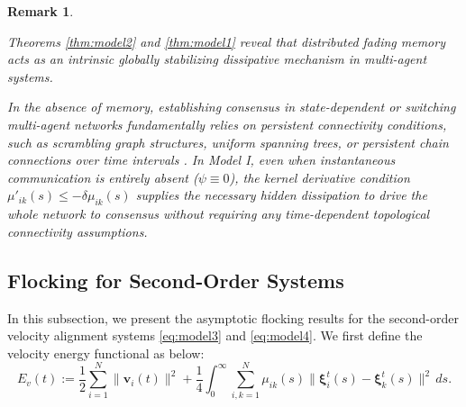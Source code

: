 \documentclass[11pt]{amsart}
\newtheorem{remark}{Remark}[section]
\numberwithin{equation}{section}
\begin{document}
\begin{remark}\label{rem:consensus_discussion}
{\rm
Theorems \ref{thm:model2} and \ref{thm:model1} reveal that distributed fading memory acts as an intrinsic globally stabilizing dissipative mechanism in multi-agent systems.

 In the absence of memory, establishing consensus in state-dependent or switching multi-agent networks fundamentally relies on persistent connectivity conditions, such as scrambling graph structures, uniform spanning trees, or persistent chain connections over time intervals \cite{Blondel2009, Canuto2012, Su2017}. In Model I, even when instantaneous communication is entirely absent ($\psi \equiv 0$), the kernel derivative condition $\mu'_{ik}(s) \le -\delta \mu_{ik}(s)$ supplies the necessary hidden dissipation to drive the whole network to consensus without requiring any time-dependent topological connectivity assumptions.
}
\end{remark}

\subsection{Flocking for Second-Order Systems}
In this subsection, we present the asymptotic flocking results for the second-order velocity alignment systems \eqref{eq:model3} and \eqref{eq:model4}. We first define the velocity energy functional as below:
\begin{equation*}\label{eq:Ev_recall}
E_v(t) := \frac12\sum_{i=1}^N\|\boldsymbol{v}_i(t)\|^2 + \frac14\int_0^\infty\sum_{i,k=1}^N \mu_{ik}(s)\|\boldsymbol{\xi}_i^t(s)-\boldsymbol{\xi}_k^t(s)\|^2\,ds.
\end{equation*}
\end{document}
